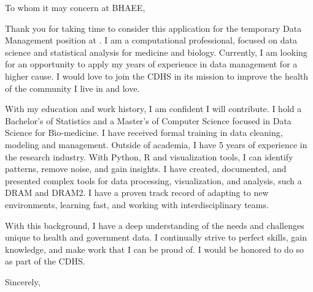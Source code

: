 \documentclass[11pt,twoside]{letter}
\begin{document}
\begin{letter}{}





\opening
{To whom it may concern at \newcommand{\cn}{BHAEE}\cn{},}

\setlength{\parindent}{15pt} %

Thank you for taking time to consider this application for the temporary Data Management position
at \cn.
I am a computational professional, focused on data science and statistical analysis for medicine and biology.
%
Currently, I am looking for an opportunity to apply my years of experience in data
management for a higher cause. I would love to join \newcommand{\cns}{the CDHS}\cns{} in its mission to improve the health of the community I live in and love.
%

With my education and work history, I am confident I will contribute.
I hold a Bachelor's of Statistics and a Master's of
Computer Science focused in Data Science for Bio-medicine.
I have received formal training in data cleaning, modeling and management.
Outside of academia, I have 5 years of experience in the research industry.
With Python, R and visualization tools, I can identify patterns, remove
noise, and gain insights.
I have created, documented, and presented complex tools for data processing, visualization, and analysis, such a DRAM and DRAM2.
I have a proven track record of adapting to new environments, learning fast, and
working with interdisciplinary teams.


With this background, I have a deep understanding of the needs and challenges unique to
health and government data.
I continually strive to perfect skills, gain knowledge, and make work that I can be proud of.
I would be honored to do so as part of \cns.


\closing{Sincerely,}


\end{letter}
\end{document}
